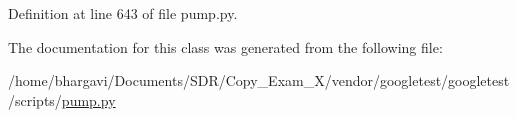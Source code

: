 Definition at line 643 of file pump.\+py.



The documentation for this class was generated from the following file\+:\begin{DoxyCompactItemize}
\item 
/home/bhargavi/\+Documents/\+S\+D\+R/\+Copy\+\_\+\+Exam\+\_\+X/vendor/googletest/googletest/scripts/\hyperlink{pump_8py}{pump.\+py}\end{DoxyCompactItemize}

